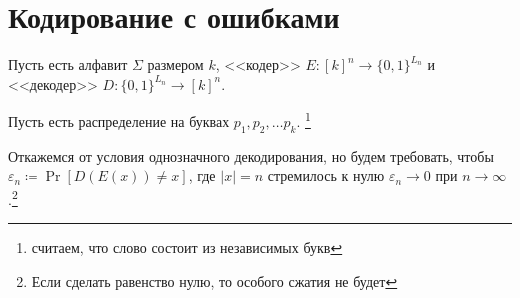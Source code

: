\section{Кодирование с ошибками}
Пусть есть алфавит $ \Sigma$ размером  $ k$, <<кодер>>  $ E \colon [k]^{n} \to  \{0, 1\}^{L_n}$ и <<декодер>> $ D\colon \{0, 1\}^{L_n} \to [k]^{n}$.

Пусть есть распределение на буквах $  p_1, p_2, \ldots p_k$. \footnote{считаем, что слово состоит из независимых букв}

Откажемся от условия однозначного декодирования, но будем требовать, чтобы 
 $ \varepsilon _n \coloneqq \Pr [D(E(x)) \ne x]$, где $\lvert x  \rvert = n$ стремилось к нулю $ \varepsilon _n \to  0$ при $ n \to  \infty$.\footnote{Если сделать равенство нулю, то особого сжатия не будет}


